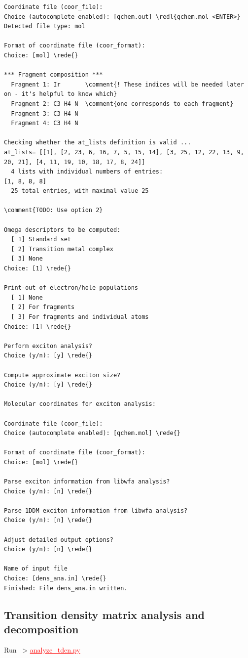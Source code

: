 \documentclass[DIV=12,headings=normal]{scrartcl}
\newcommand{\comment}[1]{\textcolor{blue}{#1}}
\newcommand{\redl}[1]{{\textcolor{red}{\underline{#1}}}}
\newcommand{\rede}[1]{\redl{#1 <ENTER>}}
\newcommand{\comm}[1]{
\small
~> \redl{#1}
\normalsize
}
\newcounter{number}
\begin{document}
\begin{Verbatim}[commandchars=\\\{\}]
Coordinate file (coor_file):
Choice (autocomplete enabled): [qchem.out] \redl{qchem.mol <ENTER>} 
Detected file type: mol

Format of coordinate file (coor_format):
Choice: [mol] \rede{}

*** Fragment composition ***
  Fragment 1: Ir       \comment{! These indices will be needed later on - it's helpful to know which}
  Fragment 2: C3 H4 N  \comment{one corresponds to each fragment} 
  Fragment 3: C3 H4 N 
  Fragment 4: C3 H4 N 

Checking whether the at_lists definition is valid ...
at_lists= [[1], [2, 23, 6, 16, 7, 5, 15, 14], [3, 25, 12, 22, 13, 9, 20, 21], [4, 11, 19, 10, 18, 17, 8, 24]]
  4 lists with individual numbers of entries:
[1, 8, 8, 8]
  25 total entries, with maximal value 25

\comment{TODO: Use option 2}

Omega descriptors to be computed:
  [ 1] Standard set
  [ 2] Transition metal complex
  [ 3] None
Choice: [1] \rede{}

Print-out of electron/hole populations
  [ 1] None
  [ 2] For fragments
  [ 3] For fragments and individual atoms
Choice: [1] \rede{}

Perform exciton analysis?
Choice (y/n): [y] \rede{}

Compute approximate exciton size?
Choice (y/n): [y] \rede{}

Molecular coordinates for exciton analysis:

Coordinate file (coor_file):
Choice (autocomplete enabled): [qchem.mol] \rede{}

Format of coordinate file (coor_format):
Choice: [mol] \rede{}

Parse exciton information from libwfa analysis?
Choice (y/n): [n] \rede{}

Parse 1DDM exciton information from libwfa analysis?
Choice (y/n): [n] \rede{}

Adjust detailed output options?
Choice (y/n): [n] \rede{}

Name of input file
Choice: [dens_ana.in] \rede{}
Finished: File dens_ana.in written.
\end{Verbatim}
\normalsize

\subsection{Transition density matrix analysis and decomposition}
Run \comm{analyze\_tden.py}
\end{document}
